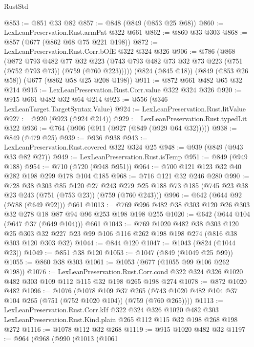 \begin{lexlean}{RustStd}
\begin{coremodule}
@853 := @851 @33 @82
@857 := @848 (@849 (@853 @25 @68))
@860 := LexLeanPreservation.Rust.armPat @322 @661
@862 := @860 @33 @303
@868 := @857 (@677 (@862 @68 @75 @221 @198))
@872 := LexLeanPreservation.Rust.Corr.bOfE @322 @324 @326
@906 := @786
    (@868
      (@872
        @793
        @482
        @77
        @32
        @223
        (@743 @793 @482 @73 @32 @73 @223 (@751 (@752 @793 @73)) (@759 (@760 @223)))))
    (@824 (@845 @18))
    (@849 (@853 @26 @58))
    (@677 (@862 @58 @25 @208 @198))
@911 := @872 @661 @482 @65 @32 @214
@915 := LexLeanPreservation.Rust.Corr.value @322 @324 @326
@920 := @915 @661 @482 @32 @64 @214
@923 := @556 (@346 LexLeanTarget.TargetSyntax.Value)
@924 := LexLeanPreservation.Rust.litValue
@927 := @920 (@923 (@924 @214))
@929 := LexLeanPreservation.Rust.typedLit @322
@936 := @764 (@906 (@911 (@927 (@849 (@929 @64 @32)))))
@938 := @849 (@479 @25)
@939 := @936 @938
@943 := LexLeanPreservation.Rust.covered @322 @324 @25
@948 := @939 (@849 (@943 @33 @82 @27))
@949 := LexLeanPreservation.Rust.isTemp
@951 := @849 (@949 @188)
@954 := @710 (@720 (@948 @951))
@964 := @700 @121 @123 @32 @40 @282 @198 @299 @178 @104 @185
@968 := @716 @121 @32 @246 @280
@990 := @728
    @38
    @303
    @85
    @120
    @27
    @243
    @279
    @25
    @188
    @73
    @185
    (@745 @23 @38 @23 @243 (@751 (@753 @23)) (@759 (@760 @243)))
@996 := @642 (@644 @92 (@788 (@649 @92))) @661
@1013 := @769 @996 @482 @38 @303 @120 @26 @303 @32 @278 @18 @87 @94 @96 @253 @198 @198 @255
@1020 := @642 (@644 @104 (@647 @37 (@649 @104))) @661
@1043 := @769
    @1020
    @482
    @38
    @303
    @120
    @25
    @303
    @32
    @227
    @23
    @99
    @106
    @116
    @262
    @198
    @198
    @274
    (@816 @38 @303 @120 @303 @32)
@1044 := @844 @120
@1047 := @1043 (@824 (@1044 @23))
@1049 := @851 @38 @120
@1053 := @1047 (@849 (@1049 @25 @99))
@1055 := @860 @38 @303
@1061 := @1053 (@677 (@1055 @99 @106 @262 @198))
@1076 := LexLeanPreservation.Rust.Corr.cond
    @322
    @324
    @326
    @1020
    @482
    @303
    @109
    @112
    @115
    @32
    @198
    @265
    @198
    @274
@1078 := @872 @1020 @482
@1096 := @1076
    (@1078
      @109
      @37
      @265
      (@743 @1020 @482 @104 @37 @104 @265 (@751 (@752 @1020 @104)) (@759 (@760 @265))))
@1113 := LexLeanPreservation.Rust.Corr.kIf
    @322
    @324
    @326
    @1020
    @482
    @303
    LexLeanPreservation.Rust.Kind.plain
    @265
    @112
    @115
    @32
    @198
    @268
    @198
    @272
@1116 := @1078 @112 @32 @268
@1119 := @915 @1020 @482 @32
@1197 := @964
    (@968
      (@990
        (@1013
          (@1061

\end{coremodule}
\end{lexlean}
